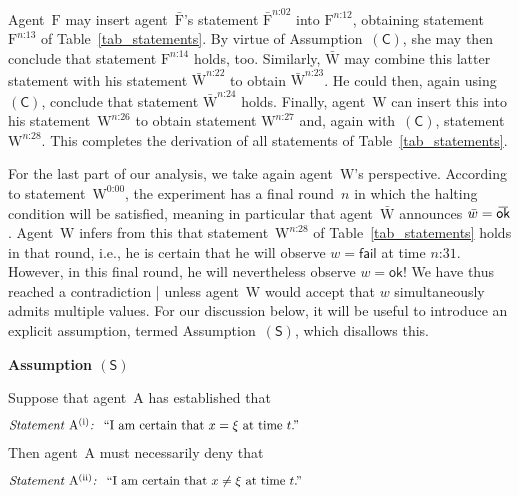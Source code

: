 \documentclass{article}
\theoremstyle{mystyle}
\theoremstyle{definition}
\newcommand{\oline}[2]{{\mkern#2mu\overline{\protect\vphantom{t}\mkern-#2mu\smash{#1}\mkern-#2mu}\mkern#2mu}}
\newcommand*{\Friendone}{\mathrm{\bar{F}}}
\newcommand*{\Friendtwo}{\mathrm{F}}
\newcommand*{\Assistant}{\mathrm{\bar{W}}}
\newcommand*{\Wigner}{\mathrm{W}}
\newcommand*{\Agent}{\mathrm{A}}
\newcommand*{\wb}{\bar{w}}
\newcommand*{\SW}{\mathsf{(S)}}
\newcommand*{\SelfCons}{\mathsf{(C)}}
\newcommand*{\ok}{\mathsf{ok}}
\newcommand*{\fail}{\mathsf{fail}}
\newcommand*{\okb}{\oline{\ok}{2.8}}
\newcommand*{\asn}[1]{``#1''}
\newcommand*{\sT}[1]{{\text{\emph{Statement} $#1$\emph{:} }}}
\newcommand*{\sTM}[1]{\begin{minipage}{14cm} \hangindent=8.6em  #1 \end{minipage}}
\begin{document}
Agent~$\Friendtwo$ may insert agent~$\Friendone$'s statement $\Friendone^{\text{$n$:02}}$ into $\Friendtwo^{\text{$n$:12}}$, obtaining statement $\Friendtwo^{\text{$n$:13}}$ of Table~\ref{tab_statements}. By virtue of Assumption~$\SelfCons$, she may then conclude  that statement  $\Friendtwo^{\text{$n$:14}}$ holds, too.
Similarly, $\Assistant$  may combine this latter statement with his statement $\Assistant^{\text{$n$:22}}$ to obtain
$\Assistant^{\text{$n$:23}}$.  He could then, again using~$\SelfCons$, conclude that statement $\Assistant^{\text{$n$:24}}$ holds.  Finally, agent~$\Wigner$ can insert this into his statement~$\Wigner^{\text{$n$:26}}$ to obtain statement $\Wigner^{\text{$n$:27}}$ and, again with~$\SelfCons$, statement $\Wigner^{\text{$n$:28}}$. This completes the derivation of all statements of Table~\ref{tab_statements}. 

For the last part of our analysis, we take again agent~$\Wigner$'s perspective. According to statement~$\Wigner^{\text{0:00}}$, the experiment has a final round~$n$ in which the halting condition will be satisfied, meaning in particular that agent~$\Assistant$ announces $\wb = \okb$. Agent~$\Wigner$ infers from this that statement~$\Wigner^{\text{$n$:28}}$ of Table~\ref{tab_statements} holds in that round, i.e., he is certain that he will observe $w = \fail$ at time $\text{$n$:31}$. However, in this final round, he will nevertheless observe $w=\ok$! We have thus reached a contradiction | unless agent~$\Wigner$ would accept that $w$ simultaneously admits multiple values. For our discussion below, it will be useful to introduce an explicit assumption, termed Assumption~$\SW$, which disallows this.

\begin{emphbox}

  \noindent \textbf{Assumption $\SW$} 
  
   \smallskip 
  
\noindent Suppose that agent~$\Agent$ has established that \nsb
\begin{align*}
\sTM{\sT{{\Agent}^{\mathrm{(i)}}} \asn{I am certain that $x=\xi$ at time $t$.} }
\end{align*}
Then agent~$\Agent$ must necessarily deny that \nsb
\begin{align*}
\sTM{\sT{{\Agent}^{\mathrm{(ii)}}} \asn{I am certain  that $x \neq \xi$ at time $t$.}}
\end{align*}
\vspace{-4ex}
\end{emphbox}
\end{document}
